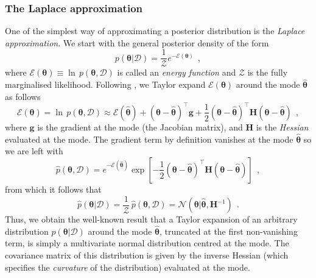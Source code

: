 \documentclass[12pt,dvipsnames]{report}
\renewcommand{\vec}[1]{\boldsymbol{\mathbf{#1}}}
\newcommand{\hquad}{~~}
\begin{document}
\subsubsection{The Laplace approximation}
One of the simplest way of approximating a posterior distribution is the
\emph{Laplace approximation}. We start with the general posterior density of
the form
\begin{equation}
    p(\vec{\theta}\lvert\mathcal{D})=\frac{1}{\mathcal{Z}}e^{-\mathcal{E}(\vec{\theta})}
    \hquad,
\end{equation}
where $\mathcal{E}(\vec{\theta}) \equiv \ln\,p(\vec{\theta}, \mathcal{D})$
is called an \emph{energy function} and $\mathcal{Z}$ is the fully marginalised
likelihood. Following \citet{murphy_book_2022}, we Taylor expand 
$\mathcal{E}(\vec{\theta})$ around the mode $\hat{\vec{\theta}}$ as follows
\begin{equation}
    \mathcal{E}(\vec{\theta}) =\ln\,p(\vec{\theta}, \mathcal{D})\approx \mathcal{E}(\hat{\vec{\theta}})+(\vec{\theta}-\hat{\vec{\theta}})^{\intercal} \vec{g}+\frac{1}{2}(\vec{\theta}-\hat{\vec{\theta}})^{\intercal} \mathbf{H}(\vec{\theta}-\hat{\vec{\theta}})
    \hquad,
\end{equation}
where $\vec{g}$ is the gradient at the mode (the Jacobian matrix), and $\vec{H}$
is the \emph{Hessian} evaluated at the mode. The gradient term by definition
vanishes at the mode $\hat{\vec{\theta}}$ so we are left with
\begin{equation}
    \hat{p}(\vec{\theta}, \mathcal{D})=e^{-\mathcal{E}(\hat{\vec{\theta}})} \exp \left[-\frac{1}{2}(\boldsymbol{\theta}-\hat{\vec{\theta}})^{\intercal} \mathbf{H}(\vec{\theta}-\hat{\vec{\theta}})\right]
    \hquad,
\end{equation}
from which it follows that
\begin{equation}
    \hat{p}(\vec{\theta} \lvert\mathcal{D})=\frac{1}{\mathcal{Z}}\, \hat{p}(\vec{\theta}, \mathcal{D})=\mathcal{N}\left(\vec{\theta} \lvert\hat{\vec{\theta}}, \mathbf{H}^{-1}\right)
    \hquad.
\end{equation}
Thus, we obtain the well-known result that a Taylor expansion of an arbitrary
distribution  $p(\vec{\theta} \lvert\mathcal{D})$ around the mode $\hat{\vec{\theta}}$,
truncated at the first non-vanishing term, is simply a multivariate normal distribution
centred at the mode. The covariance matrix of this distribution is given by the 
inverse Hessian (which specifies the \emph{curvature} of the distribution) 
evaluated at the mode.
\end{document}
